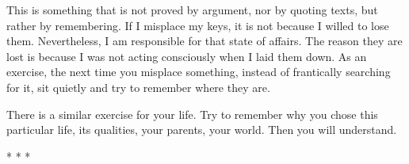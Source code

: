 This is something that is not proved by argument, nor by quoting texts, but rather by remembering. If I misplace my keys, it is not because I willed to lose them. Nevertheless, I am responsible for that state of affairs. The reason they are lost is because I was not acting consciously when I laid them down. As an exercise, the next time you misplace something, instead of frantically searching for it, sit quietly and try to remember where they are.

There is a similar exercise for your life. Try to remember why you chose this particular life, its qualities, your parents, your world. Then you will understand.


\begin{center}* * *\end{center}

